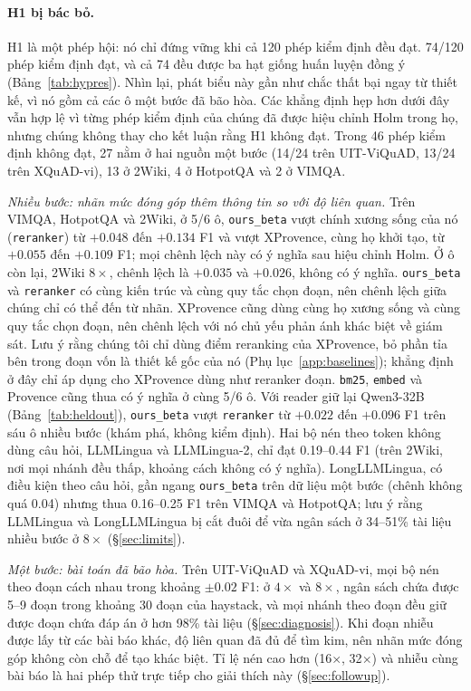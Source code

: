 \documentclass[11pt]{article}
\newcommand{\arm}[1]{\texttt{#1}}
\begin{document}
\paragraph{H1 bị bác bỏ.} H1 là một phép hội: nó chỉ đứng vững khi cả 120 phép kiểm định đều đạt. 74/120 phép
kiểm định đạt, và cả 74 đều được ba hạt giống huấn luyện đồng ý (Bảng~\ref{tab:hypres}). Nhìn lại, phát biểu này gần
như chắc thất bại ngay từ thiết kế, vì nó gồm cả các ô một bước đã bão hòa. Các khẳng định hẹp hơn dưới đây vẫn hợp lệ
vì từng phép kiểm định của chúng đã được hiệu chỉnh Holm trong họ, nhưng chúng không thay cho kết luận rằng H1 không đạt. Trong 46 phép kiểm định không đạt, 27 nằm ở hai nguồn một bước (14/24 trên
UIT-ViQuAD, 13/24 trên XQuAD-vi), 13 ở 2Wiki, 4 ở HotpotQA và 2 ở VIMQA.

\emph{Nhiều bước: nhãn mức đóng góp thêm thông tin so với độ liên quan.} Trên VIMQA, HotpotQA và 2Wiki,
ở 5/6 ô, \arm{ours\_beta} vượt chính xương sống của nó (\arm{reranker}) từ $+0.048$ đến $+0.134$ F1 và
vượt XProvence, cùng họ khởi tạo, từ $+0.055$ đến $+0.109$ F1; mọi chênh lệch này có ý nghĩa sau hiệu
chỉnh Holm. Ở ô còn lại, 2Wiki $8\times$, chênh lệch là $+0.035$ và $+0.026$, không có ý nghĩa.
\arm{ours\_beta} và \arm{reranker} có cùng kiến trúc và cùng quy tắc chọn đoạn, nên chênh lệch giữa chúng
chỉ có thể đến từ nhãn. XProvence cũng dùng cùng họ xương sống và cùng quy tắc chọn đoạn, nên chênh lệch
với nó chủ yếu phản ánh khác biệt về giám sát. Lưu ý rằng chúng tôi chỉ dùng điểm reranking của XProvence, bỏ phần tỉa
bên trong đoạn vốn là thiết kế gốc của nó (Phụ lục~\ref{app:baselines}); khẳng định ở đây chỉ áp dụng cho XProvence
dùng như reranker đoạn. \arm{bm25}, \arm{embed} và Provence cũng thua có ý nghĩa ở
cùng 5/6 ô. Với reader giữ lại Qwen3-32B (Bảng~\ref{tab:heldout}), \arm{ours\_beta} vượt \arm{reranker} từ
$+0.022$ đến $+0.096$ F1 trên sáu ô nhiều bước (khám phá, không kiểm định). Hai bộ nén theo token không dùng
câu hỏi, LLMLingua và LLMLingua-2, chỉ đạt 0.19--0.44 F1 (trên 2Wiki, nơi mọi nhánh đều thấp, khoảng cách
không có ý nghĩa). LongLLMLingua, có điều kiện theo câu hỏi, gần ngang \arm{ours\_beta} trên dữ liệu một bước
(chênh không quá 0.04) nhưng thua 0.16--0.25 F1 trên VIMQA và HotpotQA; lưu ý rằng LLMLingua và LongLLMLingua
bị cắt đuôi để vừa ngân sách ở 34--51\% tài liệu nhiều bước ở $8\times$ (\S\ref{sec:limits}).

\emph{Một bước: bài toán đã bão hòa.} Trên UIT-ViQuAD và XQuAD-vi, mọi bộ nén theo đoạn cách nhau trong
khoảng $\pm0.02$ F1: ở $4\times$ và $8\times$, ngân sách chứa được 5--9 đoạn trong khoảng 30 đoạn của
haystack, và mọi nhánh theo đoạn đều giữ được đoạn chứa đáp án ở hơn 98\% tài liệu (\S\ref{sec:diagnosis}).
Khi đoạn nhiễu được lấy từ các bài báo khác, độ liên quan đã đủ để tìm kim, nên nhãn mức đóng góp không còn
chỗ để tạo khác biệt. Tỉ lệ nén cao hơn (16$\times$, 32$\times$) và nhiễu cùng bài báo là hai phép thử trực
tiếp cho giải thích này (\S\ref{sec:followup}).
\end{document}
